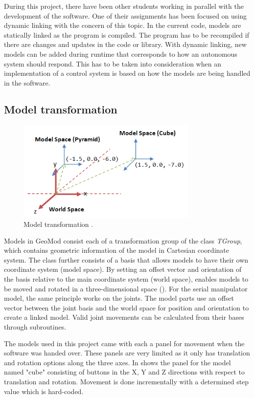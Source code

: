 During this project, there have been other students working in parallel with the development of the software. One of their assignments has been focused on using dynamic linking with the concern of this topic. In the current code, models are statically linked as the program is compiled. The program has to be recompiled if there are changes and updates in the code or library. With dynamic linking, new models can be added during runtime that corresponds to how an autonomous system should respond. This has to be taken into consideration when an implementation of a control system is based on how the models are being handled in the software.


\subsection{Model transformation}

\begin{figure}[ht]
    \centering
    \includegraphics[height=5cm]{images/ModelSpace.png}
    \caption[Model transformation \cite{modelspace}]{Model transformation \cite{modelspace}.}
    \label{fig:modelspace}
\end{figure}

Models in GeoMod consist each of a transformation group of the class \textit{TGroup}, which contains geometric information of the model in Cartesian coordinate system. The class further consists of a basis that allows models to have their own coordinate system (model space). By setting an offset vector and orientation of the basis relative to the main coordinate system (world space), enables models to be moved and rotated in a three-dimensional space (). For the serial manipulator model, the same principle works on the joints. The model parts use an offset vector between the joint basis and the world space for position and orientation to create a linked model. Valid joint movements can be calculated from their bases through subroutines.

The models used in this project came with each a panel for movement when the software was handed over. These panels are very limited as it only has translation and rotation options along the three axes. In  shows the panel for the model named "cube" consisting of buttons in the X, Y and Z directions with respect to translation and rotation. Movement is done incrementally with a determined step value which is hard-coded. 

